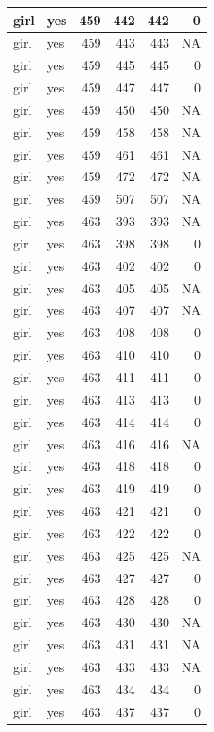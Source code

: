 \documentclass[man]{apa6}
\begin{document}
\begin{tabular}{l|l|r|r|r|r}
\hline
girl & yes & 459 & 442 & 442 & 0\\
\hline
girl & yes & 459 & 443 & 443 & NA\\
\hline
girl & yes & 459 & 445 & 445 & 0\\
\hline
girl & yes & 459 & 447 & 447 & 0\\
\hline
girl & yes & 459 & 450 & 450 & NA\\
\hline
girl & yes & 459 & 458 & 458 & NA\\
\hline
girl & yes & 459 & 461 & 461 & NA\\
\hline
girl & yes & 459 & 472 & 472 & NA\\
\hline
girl & yes & 459 & 507 & 507 & NA\\
\hline
girl & yes & 463 & 393 & 393 & NA\\
\hline
girl & yes & 463 & 398 & 398 & 0\\
\hline
girl & yes & 463 & 402 & 402 & 0\\
\hline
girl & yes & 463 & 405 & 405 & NA\\
\hline
girl & yes & 463 & 407 & 407 & NA\\
\hline
girl & yes & 463 & 408 & 408 & 0\\
\hline
girl & yes & 463 & 410 & 410 & 0\\
\hline
girl & yes & 463 & 411 & 411 & 0\\
\hline
girl & yes & 463 & 413 & 413 & 0\\
\hline
girl & yes & 463 & 414 & 414 & 0\\
\hline
girl & yes & 463 & 416 & 416 & NA\\
\hline
girl & yes & 463 & 418 & 418 & 0\\
\hline
girl & yes & 463 & 419 & 419 & 0\\
\hline
girl & yes & 463 & 421 & 421 & 0\\
\hline
girl & yes & 463 & 422 & 422 & 0\\
\hline
girl & yes & 463 & 425 & 425 & NA\\
\hline
girl & yes & 463 & 427 & 427 & 0\\
\hline
girl & yes & 463 & 428 & 428 & 0\\
\hline
girl & yes & 463 & 430 & 430 & NA\\
\hline
girl & yes & 463 & 431 & 431 & NA\\
\hline
girl & yes & 463 & 433 & 433 & NA\\
\hline
girl & yes & 463 & 434 & 434 & 0\\
\hline
girl & yes & 463 & 437 & 437 & 0\\

\end{tabular}
\end{document}
